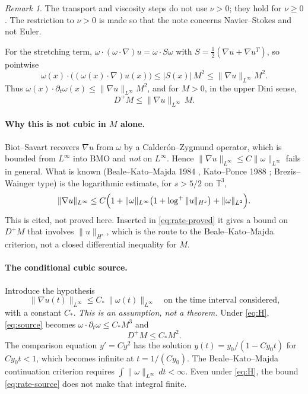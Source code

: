 \documentclass[11pt]{article}
\theoremstyle{definition}
\theoremstyle{remark}
\newtheorem{remark}{Remark}
\begin{document}
\begin{remark}
The transport and viscosity steps do not use $\nu>0$; they hold for $\nu\ge0$. The restriction to $\nu>0$ is made so that the note concerns Navier--Stokes and not Euler.
\end{remark}

For the stretching term, $\omega\cdot(\omega\cdot\nabla)u=\omega\cdot S\omega$ with $S=\tfrac12(\nabla u+\nabla u^{T})$, so pointwise
\begin{equation}
\label{eq:source}
\omega(x)\cdot\bigl((\omega(x)\cdot\nabla)u(x)\bigr)\le |S(x)|\,M^2\le\|\nabla u\|_{L^\infty} M^2.
\end{equation}
Thus $\omega(x)\cdot\partial_t\omega(x)\le\|\nabla u\|_{L^\infty} M^2$, and for $M>0$, in the upper Dini sense,
\begin{equation}
\label{eq:rate-proved}
D^+M\le\|\nabla u\|_{L^\infty}\, M.
\end{equation}

\paragraph{Why this is not cubic in $M$ alone.} Biot--Savart recovers $\nabla u$ from $\omega$ by a Calder\'on--Zygmund operator, which is bounded from $L^\infty$ into $\mathrm{BMO}$ and \emph{not} on $L^\infty$. Hence $\|\nabla u\|_{L^\infty}\le C\|\omega\|_{L^\infty}$ fails in general. What is known (Beale--Kato--Majda 1984 \cite{BKM}, Kato--Ponce 1988 \cite{KP}; Brezis--Wainger type) is the logarithmic estimate, for $s>5/2$ on $\mathbb{T}^3$,
\begin{equation}
\label{eq:log}
\|\nabla u\|_{L^\infty}\le C\Bigl(1+\|\omega\|_{L^\infty}\bigl(1+\log^+\|u\|_{H^s}\bigr)+\|\omega\|_{L^2}\Bigr).
\end{equation}
This is cited, not proved here. Inserted in \eqref{eq:rate-proved} it gives a bound on $D^+M$ that involves $\|u\|_{H^s}$, which is the route to the Beale--Kato--Majda criterion, not a closed differential inequality for $M$.

\paragraph{The conditional cubic source.} Introduce the hypothesis
\begin{equation}
\label{eq:H}
\tag{H}
\|\nabla u(t)\|_{L^\infty}\le C_*\,\|\omega(t)\|_{L^\infty}\quad\text{on the time interval considered,}
\end{equation}
with a constant $C_*$. \emph{This is an assumption, not a theorem.} Under \eqref{eq:H}, \eqref{eq:source} becomes $\omega\cdot\partial_t\omega\le C_* M^3$ and
\begin{equation}
\label{eq:rate-source}
D^+M\le C_* M^2.
\end{equation}
The comparison equation $y'=C y^2$ has the solution $y(t)=y_0/(1-C y_0 t)$ for $C y_0 t<1$, which becomes infinite at $t=1/(C y_0)$. The Beale--Kato--Majda continuation criterion requires $\int\|\omega\|_{L^\infty}\,dt<\infty$. Even under \eqref{eq:H}, the bound \eqref{eq:rate-source} does not make that integral finite.
\end{document}
